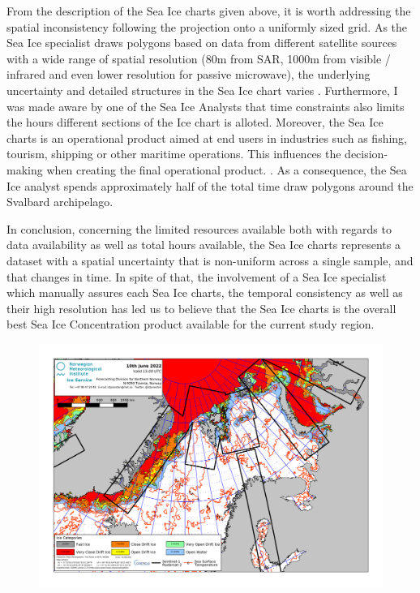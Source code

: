 \documentclass[../main/thesis.tex]{subfiles}
\begin{document}
From the description of the Sea Ice charts given above, it is worth addressing the spatial inconsistency following the projection onto a uniformly sized grid. As the Sea Ice specialist draws polygons based on data from different satellite sources with a wide range of spatial resolution (80m from SAR, 1000m from visible / infrared and even lower resolution for passive microwave), the underlying uncertainty and detailed structures in the Sea Ice chart varies \cite{MOI2015}. Furthermore, I was made aware by one of the Sea Ice Analysts that time constraints also limits the hours different sections of the Ice chart is alloted. Moreover, the Sea Ice charts is an operational product aimed at end users in industries such as fishing, tourism, shipping or other maritime operations. This influences the decision-making when creating the final operational product. . As a consequence, the Sea Ice analyst spends approximately half of the total time draw polygons around the Svalbard archipelago. 

In conclusion, concerning the limited resources available both with regards to data availability as well as total hours available, the Sea Ice charts represents a dataset with a spatial uncertainty that is non-uniform across a single sample, and that changes in time. In spite of that, the involvement of a Sea Ice specialist which manually assures each Sea Ice charts, the temporal consistency as well as their high resolution has led us to believe that the Sea Ice charts is the overall best Sea Ice Concentration product available for the current study region.

\begin{figure}
    \includegraphics[width=\textwidth]{../figures/general_latest.png}
\end{figure}
\end{document}
